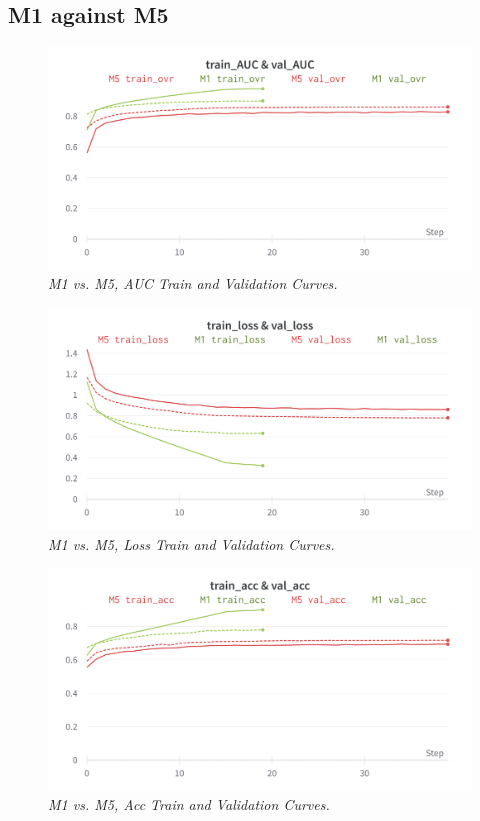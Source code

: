 \newpage


\subsection{M1 against M5}

\begin{figure}[H]
  \centering
  \includegraphics[width=\textwidth]{imatges/results/AUCM1M5.png}
  \caption[M1 vs. M5, AUC Train and Validation Curves]{\textit{M1 vs. M5, AUC Train and Validation Curves. }}
\end{figure}


\begin{figure}[H]
  \centering
  \includegraphics[width=\textwidth]{imatges/results/LossM1M5.png}
  \caption[M1 vs. M5, Loss Train and Validation Curves]{\textit{M1 vs. M5, Loss Train and Validation Curves. }}
\end{figure}

\newpage

\begin{figure}[H]
  \centering
  \includegraphics[width=\textwidth]{imatges/results/AccM1M5.png}
  \caption[M1 vs. M5, Acc Train and Validation Curves]{\textit{M1 vs. M5, Acc Train and Validation Curves. }}
\end{figure}


